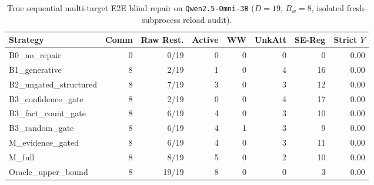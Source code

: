 \begin{table}[t]
\centering\small
\caption{True sequential multi-target E2E blind repair on \texttt{Qwen2.5-Omni-3B} ($D=19$, $B_w=8$, isolated fresh-subprocess reload audit).}
\begin{tabular}{lrrrrrrr}
\toprule
Strategy & Comm & Raw Rest. & Active & WW & UnkAtt & SE-Reg & Strict $Y$ \\
\midrule
B0\_no\_repair & 0 & 0/19 & 0 & 0 & 0 & 0 & 0.00 \\
B1\_generative & 8 & 2/19 & 1 & 0 & 4 & 16 & 0.00 \\
B2\_ungated\_structured & 8 & 7/19 & 3 & 0 & 3 & 12 & 0.00 \\
B3\_confidence\_gate & 8 & 2/19 & 0 & 0 & 4 & 17 & 0.00 \\
B3\_fact\_count\_gate & 8 & 6/19 & 4 & 0 & 3 & 10 & 0.00 \\
B3\_random\_gate & 8 & 6/19 & 4 & 1 & 3 & 9 & 0.00 \\
M\_evidence\_gated & 8 & 6/19 & 4 & 0 & 3 & 11 & 0.00 \\
M\_full & 8 & 8/19 & 5 & 0 & 2 & 10 & 0.00 \\
Oracle\_upper\_bound & 8 & 19/19 & 8 & 0 & 0 & 3 & 0.00 \\
\bottomrule
\end{tabular}
\end{table}

